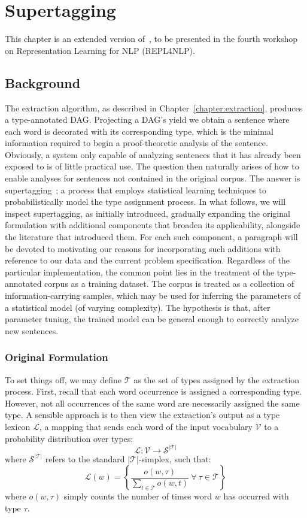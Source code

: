 \chapter{Supertagging}
This chapter is an extended version of~\cite{constructive}, to be presented in the fourth workshop on Representation Learning for NLP (REPL4NLP).

\section{Background}
The extraction algorithm, as described in Chapter~\ref{chapter:extraction}, produces a type-annotated DAG.
Projecting a DAG's yield we obtain a sentence where each word is decorated with its corresponding type, which is the minimal information required to begin a proof-theoretic analysis of the sentence.
Obviously, a system only capable of analyzing sentences that it has already been exposed to is of little practical use.
The question then naturally arises of how to enable analyses for sentences not contained in the original corpus.
The answer is supertagging~\cite{supertagging}; a process that employs statistical learning techniques to probabilistically model the type assignment process.
In what follows, we will inspect supertagging, as initially introduced, gradually expanding the original formulation with additional components that broaden its applicability, alongside the literature that introduced them. 
For each such component, a paragraph will be devoted to motivating our reasons for incorporating such additions with reference to our data and the current problem specification.
Regardless of the particular implementation, the common point lies in the treatment of the type-annotated corpus as a training dataset. 
The corpus is treated as a collection of information-carrying samples, which may be used for inferring the parameters of a statistical model (of varying complexity).
The hypothesis is that, after parameter tuning, the trained model can be general enough to correctly analyze new sentences.

\subsection{Original Formulation}
To set things off, we may define $\mathcal{T}$ as the set of types assigned by the extraction process.
First, recall that each word occurrence is assigned a corresponding type.
However, not all occurrences of the same word are necessarily assigned the same type.
A sensible approach is to then view the extraction's output as a type lexicon $\mathcal L$, a mapping that sends each word of the input vocabulary $\mathcal{V}$ to a probability distribution over types:
\[
\mathcal{L}: \mathcal{V} \to \mathcal{S}^{|\mathcal{T}|}
\]
where $\mathcal{S}^{|\mathcal{T}|}$ refers to the standard $|\mathcal{T}|$-simplex, such that:
\[
\mathcal{L}(w) = \left \{ \frac{o(w, \tau)}{\sum_{t \in \mathcal{T}}{o(w, t)}} \ \forall \ \tau \in \mathcal{T} \right \} 
\]
where $o(w, \tau)$ simply counts the number of times word $w$ has occurred with type $\tau$.

